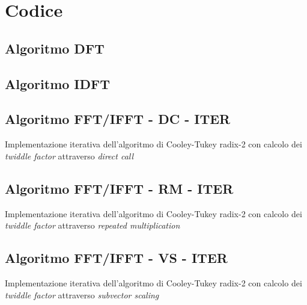 \newpage
\appendix

\chapter{Codice}
\section{Algoritmo DFT}

\section{Algoritmo IDFT}

\section{Algoritmo FFT/IFFT - DC - ITER}
Implementazione iterativa dell'algoritmo di Cooley-Tukey radix-2 con calcolo dei \emph{twiddle factor} attraverso \emph{direct call}

\section{Algoritmo FFT/IFFT - RM - ITER}
Implementazione iterativa dell'algoritmo di Cooley-Tukey radix-2 con calcolo dei \emph{twiddle factor} attraverso \emph{repeated multiplication}

\section{Algoritmo FFT/IFFT - VS - ITER}
Implementazione iterativa dell'algoritmo di Cooley-Tukey radix-2 con calcolo dei \emph{twiddle factor} attraverso \emph{subvector scaling}


